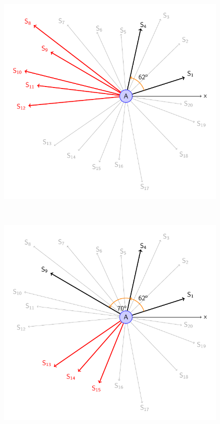 \begin{figure}[h]
\begin{minipage}{.3\linewidth}
	\end{minipage}
	\hfill
	\begin{minipage}{.3\linewidth}
		\includegraphics[scale=.5]{setSensors_3.pdf}
	\end{minipage}
	\\
	\begin{minipage}{.3\linewidth}
		\includegraphics[scale=.5]{setSensors_4.pdf}

\end{minipage}
\end{figure}
